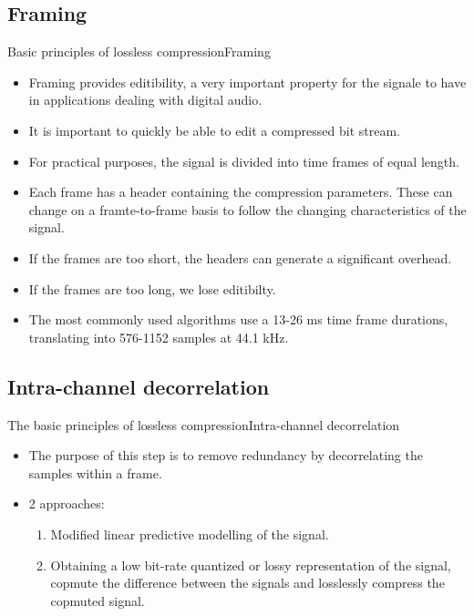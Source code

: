 \documentclass{beamer}
\begin{document}
\subsection{Framing}
\begin{frame}{Basic principles of lossless compression}{Framing}
	\begin{itemize}
		\item{
			Framing provides editibility, a very important property for the signale to have in applications dealing with digital audio.
		}
		\item{
			It is important to quickly be able to edit a compressed bit stream.
		}
		\item{
			For practical purposes, the signal is divided into time frames of equal length.
		}
		\item{
			Each frame has a header containing the compression parameters. These can change on a framte-to-frame basis to follow the changing characteristics of the signal.
		}
		\item{
			If the frames are too short, the headers can generate a significant overhead.
		}
		\item{
			If the frames are too long, we lose editibilty.
		}
		\item{
			The most commonly used algorithms use a 13-26 ms time frame durations, translating into 576-1152 samples at 44.1 kHz.
		}
	\end{itemize}
\end{frame}

\subsection{Intra-channel decorrelation}
\begin{frame}{The basic principles of lossless compression}{Intra-channel decorrelation}
	\begin{itemize}
		\item{
			The purpose of this step is to remove redundancy by decorrelating the samples within a frame.
		}
		\item{
			2 approaches:
		}
		\begin{enumerate}
			\item{
				Modified linear predictive modelling of the signal.
			}
			\item{
				Obtaining a low bit-rate quantized or lossy representation of the signal, copmute the difference between the signals and losslessly compress the copmuted signal.
			}
		\end{enumerate}
	\end{itemize}
\end{frame}
\end{document}
